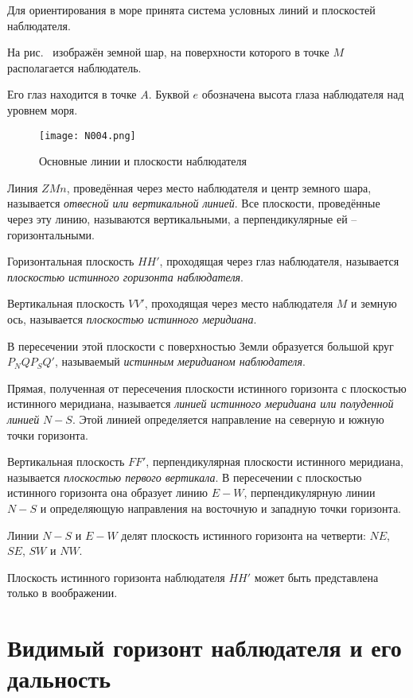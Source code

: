 Для ориентирования в море принята система условных линий и плоскостей
наблюдателя.

На рис.~ изображён земной шар, на поверхности которого в точке
$M$ располагается наблюдатель.

Его глаз находится в точке $A$. Буквой $e$ обозначена высота глаза
наблюдателя над уровнем моря.

\begin{wrapfigure}{O}{0.4\textwidth}
  \centering{}
  \texttt{[image: N004.png]}
  \caption{Основные линии и плоскости наблюдателя}
  \label{fig:N4}
\end{wrapfigure}

Линия $ZMn$, проведённая через место наблюдателя и центр земного шара,
называется \textit{отвесной или вертикальной линией}. Все плоскости,
проведённые через эту линию, называются вертикальными, а
перпендикулярные ей \--- горизонтальными.

Горизонтальная плоскость $HH'$, проходящая через глаз наблюдателя,
называется \textit{плоскостью истинного горизонта наблюдателя}.

Вертикальная плоскость $VV'$, проходящая через место наблюдателя $M$ и
земную ось, называется \textit{плоскостью истинного меридиана}.

В пересечении этой плоскости с поверхностью Земли образуется большой
круг $P_NQP_SQ'$, называемый \textit{истинным меридианом наблюдателя}.

Прямая, полученная от пересечения плоскости истинного горизонта с
плоскостью истинного меридиана, называется \textit{линией истинного меридиана
или полуденной линией} $N-S$. Этой линией определяется направление на
северную и южную точки горизонта.

Вертикальная плоскость $FF'$, перпендикулярная плоскости истинного
меридиана, называется \textit{плоскостью первого вертикала}. В пересечении с
плоскостью истинного горизонта она образует линию $E-W$,
перпендикулярную линии $N-S$ и определяющую направления на восточную и
западную точки горизонта.

Линии $N-S$ и $E-W$ делят плоскость истинного горизонта на четверти:
$NE$, $SE$, $SW$ и $NW$.

Плоскость истинного горизонта наблюдателя $HH'$ может быть
представлена только в воображении.

\section{Видимый горизонт наблюдателя и его дальность}

